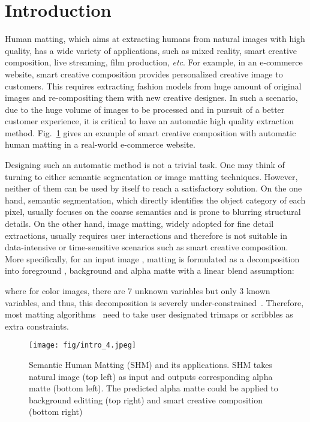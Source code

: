 \section{Introduction}




Human matting, which aims at extracting humans from natural images with high quality, has a wide variety of applications, such as mixed reality, smart creative composition, live streaming, film production, \emph{etc}.
For example, in an e-commerce website, smart creative composition provides personalized creative image to customers.
This requires extracting fashion models from huge amount of original images and re-compositing them with new creative designes.
In such a scenario, due to the huge volume of images to be processed and in pursuit of a better customer experience,
it is critical to have an automatic high quality extraction method.
Fig.~\ref{human_matting} gives an example of smart creative composition with automatic human matting in a real-world e-commerce website.

Designing such an automatic method is not a trivial task.
One may think of turning to either semantic segmentation or image matting techniques.
However, neither of them can be used by itself to reach a satisfactory solution.
On the one hand, semantic segmentation, which directly identifies the object category of each pixel, 
usually focuses on the coarse semantics and is prone to blurring structural details.
On the other hand, image matting, widely adopted for fine detail extractions, usually requires user interactions and therefore is not suitable in data-intensive or time-sensitive scenarios such as smart creative composition.
More specifically,
for an input image , matting is formulated as a decomposition into foreground , background  and alpha matte  with a linear blend assumption:

where for color images, there are 7 unknown variables but only 3 known variables, and thus, this decomposition is severely under-constrained~\cite{levin2008closed}.
Therefore, most matting algorithms~\cite{levin2008closed,chen2013knn,aksoy2017designing,xu2017deep} need to take user designated trimaps or scribbles as extra constraints.







\begin{figure}
  \centering
\texttt{[image: fig/intro\_4.jpeg]}\\
  \caption{Semantic Human Matting (SHM) and its applications. SHM takes natural image (top left) as input and outputs corresponding alpha matte (bottom left). The predicted alpha matte could be applied to background editting (top right) and smart creative composition (bottom right)}
  \label{human_matting}
\end{figure}




